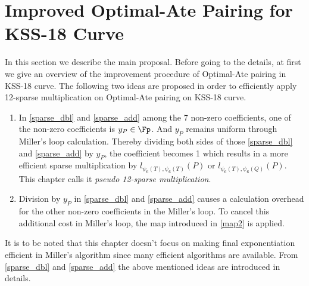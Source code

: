\section{Improved Optimal-Ate Pairing for KSS-18 Curve} 
In this section we describe the main proposal. Before going to the details, at first we give an overview of the improvement procedure of Optimal-Ate pairing in KSS-18 curve. The following two ideas are proposed in order to efficiently apply 12-sparse multiplication on Optimal-Ate pairing on KSS-18 curve. 
\begin{enumerate}
	\item In \eqref{sparse_dbl} and \eqref{sparse_add} among the 7 non-zero coefficients, one of the non-zero coefficients is $y_P \in \Fp$. And $y_P$ remains uniform through Miller's loop calculation. Thereby dividing both sides of those \eqref{sparse_dbl} and \eqref{sparse_add} by $y_P$, the coefficient becomes 1 which results in a more efficient sparse multiplication by $l_{\psi_6(T),\psi_6(T)}(P)$ or $l_{\psi_6(T),\psi_6(Q)}(P)$. This chapter calls it \textit{pseudo 12-sparse multiplication}.
	\item Division by $y_P$ in \eqref{sparse_dbl} and \eqref{sparse_add} causes a calculation overhead for the other non-zero coefficients in the Miller's loop. To cancel this  additional cost in Miller's loop, the map introduced in \eqref{map2} is applied.
\end{enumerate}
It is to be noted that this chapter doesn't focus on making final exponentiation efficient in Miller's algorithm since many efficient algorithms are available.
From \eqref{sparse_dbl} and \eqref{sparse_add} the above mentioned ideas are introduced in details.
